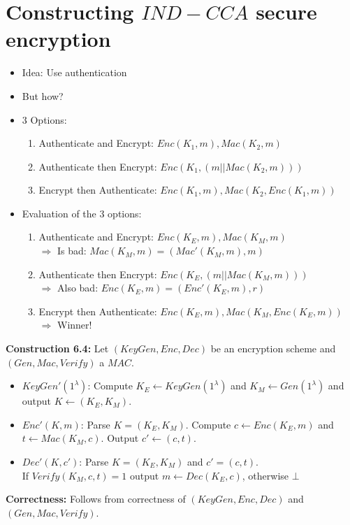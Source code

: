 \section{Constructing $IND-CCA$ secure encryption}
	\begin{itemize}
		\item Idea: Use authentication
		\item But how?
		\item 3 Options:
		\begin{enumerate}
			\item Authenticate and Encrypt: $Enc(K_1,m),Mac(K_2,m)$
			\item Authenticate then Encrypt: $Enc(K_1,(m||Mac(K_2,m)))$
			\item Encrypt then Authenticate: $Enc(K_1,m),Mac(K_2,Enc(K_1,m))$
		\end{enumerate}
		\item Evaluation of the 3 options:
		\begin{enumerate}
			\item Authenticate and Encrypt: $Enc(K_E,m),Mac(K_M,m)$\\
				$\Rightarrow$ Is bad: $Mac(K_M,m) = (Mac'(K_M,m),m)$
			\item Authenticate then Encrypt: $Enc(K_E,(m||Mac(K_M,m)))$\\
				$\Rightarrow$ Also bad: $Enc(K_E,m) = (Enc'(K_E,m),r)$
			\item Encrypt then Authenticate: $Enc(K_E,m),Mac(K_M,Enc(K_E,m))$\\
				$\Rightarrow$ Winner!
		\end{enumerate}
	\end{itemize}

	\textbf{Construction 6.4:}
	Let $(KeyGen,Enc,Dec)$ be an encryption scheme and\\
	$(Gen,Mac,Verify)$ a $MAC$.
	\begin{itemize}
		\item $KeyGen'(1^{\lambda})$: Compute $K_E \leftarrow KeyGen(1^{\lambda})$ and $K_M \leftarrow Gen(1^{\lambda})$ and output $K \leftarrow (K_E,K_M)$.
		\item $Enc'(K,m)$: Parse $K = (K_E,K_M)$.
			Compute $c \leftarrow Enc(K_E,m)$ and $t \leftarrow Mac(K_M,c)$.
			Output $c' \leftarrow (c,t)$.
		\item $Dec'(K,c')$: Parse $K = (K_E,K_M)$ and $c' = (c,t)$.\\
			If $Verify(K_M,c,t) = 1$ output $m \leftarrow Dec(K_E,c)$, otherwise $\bot$
	\end{itemize}
	\textbf{Correctness:}
	Follows from correctness of $(KeyGen,Enc,Dec)$ and $(Gen,Mac,Verify)$.
	
